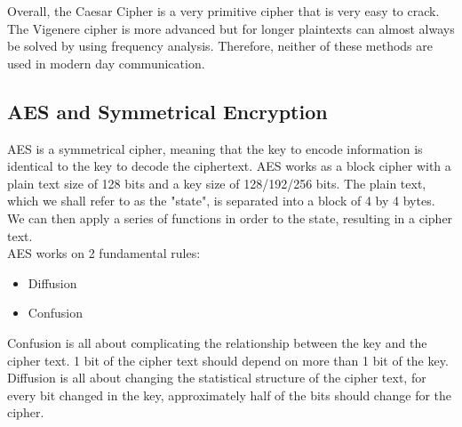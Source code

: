 \documentclass{article}
\begin{document}
Overall, the Caesar Cipher is a very primitive cipher that is very easy to
crack. The Vigenere cipher is more advanced but for longer plaintexts can
almost always be solved by using frequency analysis. Therefore, neither of
these methods are used in modern day communication.

\subsection{AES and Symmetrical Encryption}
AES is a symmetrical cipher, meaning that the key to encode information is identical to the key to decode the ciphertext.
AES works as a block cipher with a plain text size of 128 bits and a key size of 128/192/256 bits. The plain text, which we shall refer to as the "state", is separated into a block of 4 by 4 bytes. We can then apply a series of functions in order to the state, resulting in a cipher text.
\\
AES works on 2 fundamental rules:
\begin{itemize}
    \item Diffusion
    \item Confusion
    \medskip
\end{itemize}
Confusion is all about complicating the relationship between the key and the cipher text. 1 bit of the cipher text should depend on more than 1 bit of the key. Diffusion is all about changing the statistical structure of the cipher text, for every bit changed in the key, approximately half of the bits should change for the cipher.
\end{document}
